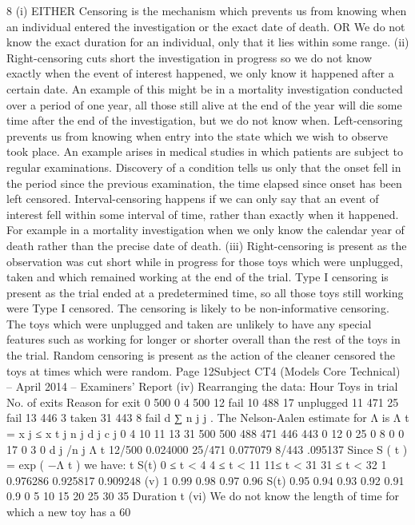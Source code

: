 \documentclass[a4paper,12pt]{article}
\begin{document}
\begin{enumerate}
8
(i)
EITHER
Censoring is the mechanism which prevents us from knowing when an
individual entered the investigation or the exact date of death.
OR
We do not know the exact duration for an individual, only that it lies within
some range.
(ii)
Right-censoring cuts short the investigation in progress so we do not know
exactly when the event of interest happened, we only know it happened after a
certain date.
An example of this might be in a mortality investigation conducted over a
period of one year, all those still alive at the end of the year will die some time
after the end of the investigation, but we do not know when.
Left-censoring prevents us from knowing when entry into the state which we
wish to observe took place.
An example arises in medical studies in which patients are subject to regular
examinations. Discovery of a condition tells us only that the onset fell in the
period since the previous examination, the time elapsed since onset has been
left censored.
Interval-censoring happens if we can only say that an event of interest fell
within some interval of time, rather than exactly when it happened.
For example in a mortality investigation when we only know the calendar year
of death rather than the precise date of death.
(iii)
Right-censoring is present as the observation was cut short while in progress
for those toys which were unplugged, taken and which remained working at
the end of the trial.
Type I censoring is present as the trial ended at a predetermined time, so all
those toys still working were Type I censored.
The censoring is likely to be non-informative censoring. The toys which were
unplugged and taken are unlikely to have any special features such as working
for longer or shorter overall than the rest of the toys in the trial.
Random censoring is present as the action of the cleaner censored the toys at
times which were random.
Page 12Subject CT4 (Models Core Technical) – April 2014 – Examiners’ Report
(iv)
Rearranging the data:
Hour
Toys in trial
No. of exits
Reason for exit
0
500
0
4
500
12
fail
10
488
17
unplugged
11
471
25
fail
13
446
3
taken
31
443
8
fail
d
∑ n j j .
The Nelson-Aalen estimate for Λ is Λ t =
x j ≤ x
t j n j d j c j
0
4
10
11
13
31 500
500
488
471
446
443 0
12
0
25
0
8 0
0
17
0
3
0
d j /n j Λ t
12/500 0.024000
25/471 0.077079
8/443 .095137
Since S ( t ) = exp ( −Λ t ) we have:
t S(t)
0 ≤ t < 4
4 ≤ t < 11
11≤ t < 31
31 ≤ t < 32 1
0.976286
0.925817
0.909248
(v)
1
0.99
0.98
0.97
0.96
S(t) 0.95
0.94
0.93
0.92
0.91
0.9
0
5
10
15
20
25
30
35
Duration t
(vi)
We do not know the length of time for which a new toy has a 60%

\end{enumerate}
\end{document}
